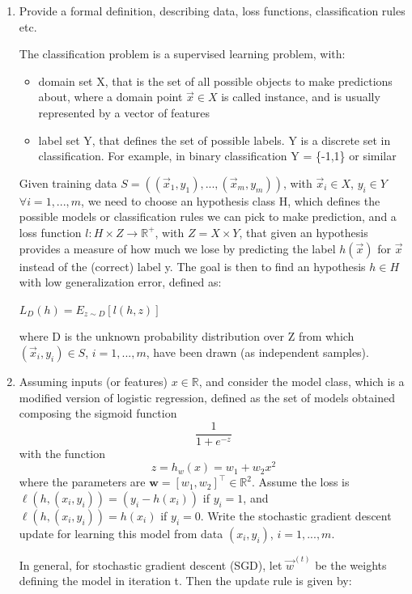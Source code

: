 \documentclass[a4paper,11pt,oneside]{book}
\begin{document}
\begin{enumerate}
    \item Provide a formal definition, describing data, loss functions, classification rules etc.
        \begin{solution}
            The classification problem is a supervised learning problem, with:
            \begin{itemize}
            \item domain set X, that is the set of all possible objects to make predictions about, where a domain point $\vec{x} \in X$ is called instance, and is usually represented by a vector of features
            
            \item label set Y, that defines the set of possible labels. Y is a discrete set in classification. For example, in binary classification Y = \{-1,1\} or similar
            \end{itemize}
            
            Given training data $S = ((\vec{x}_1, y_1), ..., (\vec{x}_m, y_m))$, with $\vec{x}_i \in X$, $y_i \in Y$ $\forall i=1,...,m$, we need to choose an hypothesis class H, which defines the possible models or classification rules we can pick to make prediction, and a loss function $l: H \times Z \to \mathbb{R}^+$, with $Z = X \times Y$, that given an hypothesis provides a measure of how much we lose by predicting the label $h(\vec{x})$ for $\vec{x}$ instead of the (correct) label y. The goal is then to find an hypothesis $h \in H$ with low generalization error, defined as:
            
            $L_D(h) = E_{z\sim D}[l(h,z)]$
            
            where D is the unknown probability distribution over Z from which $(\vec{x}_i, y_i) \in S$, $i=1,...,m$, have been drawn (as independent samples).
        \end{solution}

    \item Assuming inputs (or features) \( x \in \mathbb{R} \), and consider the model class, which is a modified version of logistic regression, defined as the set of models obtained composing the sigmoid function  
    \[
    \frac{1}{1 + e^{-z}}
    \]
    with the function  
    \[
    z = h_w(x) = w_1 + w_2x^2
    \]
    where the parameters are \(\mathbf{w} = [w_1, w_2]^\top \in \mathbb{R}^2\). Assume the loss is \(\ell(h, (x_i, y_i)) = (y_i - h(x_i))\) if \(y_i = 1\), and \(\ell(h, (x_i, y_i)) = h(x_i)\) if \(y_i = 0\). Write the stochastic gradient descent update for learning this model from data \((x_i, y_i)\), \(i = 1, ..., m\).
        \begin{solution}
            In general, for stochastic gradient descent (SGD), let $\vec{w}^{(t)}$ be the weights defining the model in iteration t. Then the update rule is given by:
            

\end{solution}
\end{enumerate}
\end{document}
